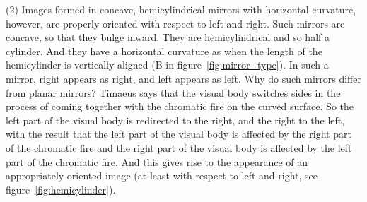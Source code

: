 (2) Images formed in concave, hemicylindrical mirrors with horizontal curvature, however, are properly oriented with respect to left and right. Such mirrors are concave, so that they bulge inward. They are hemicylindrical and so half a cylinder. And they have a horizontal curvature as when the length of the hemicylinder is vertically aligned (B in figure~\ref{fig:mirror_type}). In such a mirror, right appears as right, and left appears as left. Why do such mirrors differ from planar mirrors? Timaeus says that the visual body switches sides in the process of coming together with the chromatic fire on the curved surface. So the left part of the visual body is redirected to the right, and the right to the left, with the result that the left part of the visual body is affected by the right part of the chromatic fire and the right part of the visual body is affected by the left part of the chromatic fire. And this gives rise to the appearance of an appropriately oriented image (at least with respect to left and right, see figure~\ref{fig:hemicylinder}).


